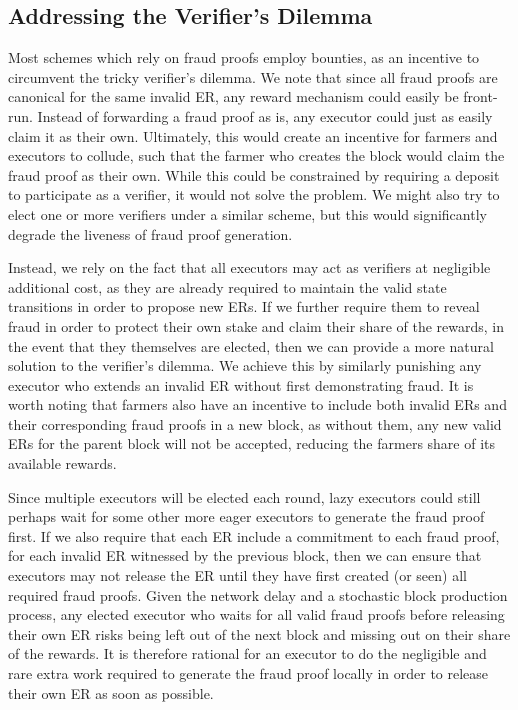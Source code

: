 \documentclass[conference]{IEEEtran}
\begin{document}
\subsection{Addressing the Verifier's Dilemma}

Most schemes which rely on fraud proofs employ bounties, as an incentive to circumvent the tricky verifier’s dilemma. We note that since all fraud proofs are canonical for the same invalid ER, any reward mechanism could easily be front-run. Instead of forwarding a fraud proof as is, any executor could just as easily claim it as their own. Ultimately, this would create an incentive for farmers and executors to collude, such that the farmer who creates the block would claim the fraud proof as their own. While this could be constrained by requiring a deposit to participate as a verifier, it would not solve the problem. We might also try to elect one or more verifiers under a similar scheme, but this would significantly degrade the liveness of fraud proof generation.

Instead, we rely on the fact that all executors may act as verifiers at negligible additional cost, as they are already required to maintain the valid state transitions in order to propose new ERs. If we further require them to reveal fraud in order to protect their own stake and claim their share of the rewards, in the event that they themselves are elected, then we can provide a more natural solution to the verifier’s dilemma. We achieve this by similarly punishing any executor who extends an invalid ER without first demonstrating fraud. It is worth noting that farmers also have an incentive to include both invalid ERs and their corresponding fraud proofs in a new block, as without them, any new valid ERs for the parent block will not be accepted, reducing the farmers share of its available rewards.

Since multiple executors will be elected each round, lazy executors could still perhaps wait for some other more eager executors to generate the fraud proof first. If we also require that each ER include a commitment to each fraud proof, for each invalid ER witnessed by the previous block, then we can ensure that executors may not release the ER until they have first created (or seen) all required fraud proofs. Given the network delay and a stochastic block production process, any elected executor who waits for all valid fraud proofs before releasing their own ER risks being left out of the next block and missing out on their share of the rewards. It is therefore rational for an executor to do the negligible and rare extra work required to generate the fraud proof locally in order to release their own ER as soon as possible.
\end{document}
